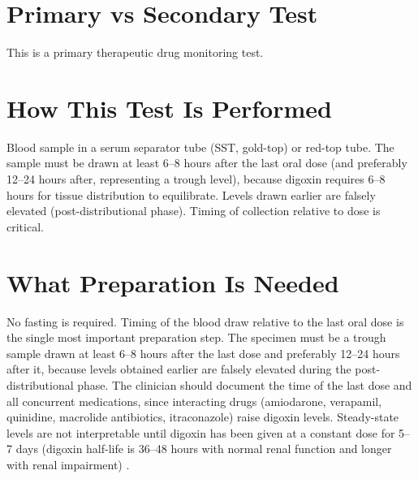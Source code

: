 \section*{Primary vs Secondary Test}
This is a primary therapeutic drug monitoring test.

\section*{How This Test Is Performed}
Blood sample in a serum separator tube (SST, gold-top) or red-top tube. The sample must be drawn at least 6--8 hours after the last oral dose (and preferably 12--24 hours after, representing a trough level), because digoxin requires 6--8 hours for tissue distribution to equilibrate. Levels drawn earlier are falsely elevated (post-distributional phase). Timing of collection relative to dose is critical.

\section*{What Preparation Is Needed}
No fasting is required. Timing of the blood draw relative to the last oral dose is the single most important preparation step. The specimen must be a trough sample drawn at least 6--8 hours after the last dose and preferably 12--24 hours after it, because levels obtained earlier are falsely elevated during the post-distributional phase. The clinician should document the time of the last dose and all concurrent medications, since interacting drugs (amiodarone, verapamil, quinidine, macrolide antibiotics, itraconazole) raise digoxin levels. Steady-state levels are not interpretable until digoxin has been given at a constant dose for 5--7 days (digoxin half-life is 36--48 hours with normal renal function and longer with renal impairment) \cite{burton2006applied}.

